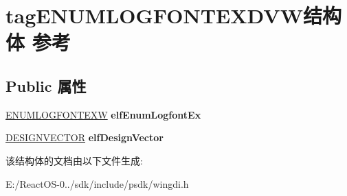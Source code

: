 \hypertarget{structtag_e_n_u_m_l_o_g_f_o_n_t_e_x_d_v_w}{}\section{tag\+E\+N\+U\+M\+L\+O\+G\+F\+O\+N\+T\+E\+X\+D\+V\+W结构体 参考}
\label{structtag_e_n_u_m_l_o_g_f_o_n_t_e_x_d_v_w}
\subsection*{Public 属性}
\begin{DoxyCompactItemize}
\item 
\mbox{\label{structtag_e_n_u_m_l_o_g_f_o_n_t_e_x_d_v_w_ae9252462cd311c588f6cbded82c01c35}} 
\hyperlink{structtag_e_n_u_m_l_o_g_f_o_n_t_e_x_w}{E\+N\+U\+M\+L\+O\+G\+F\+O\+N\+T\+E\+XW} {\bfseries elf\+Enum\+Logfont\+Ex}
\item 
\mbox{\label{structtag_e_n_u_m_l_o_g_f_o_n_t_e_x_d_v_w_abd5a1f7cfff974754a7941f173ae1c05}} 
\hyperlink{struct___d_e_s_i_g_n_v_e_c_t_o_r}{D\+E\+S\+I\+G\+N\+V\+E\+C\+T\+OR} {\bfseries elf\+Design\+Vector}
\end{DoxyCompactItemize}


该结构体的文档由以下文件生成\+:\begin{DoxyCompactItemize}
\item 
E\+:/\+React\+O\+S-\/0../sdk/include/psdk/wingdi.\+h\end{DoxyCompactItemize}

